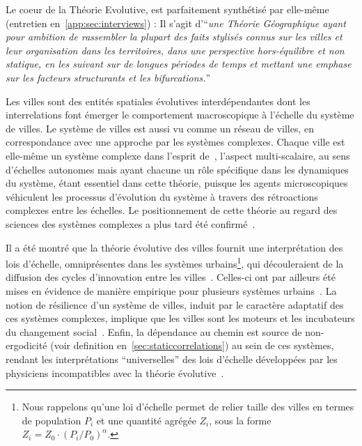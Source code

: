 Le coeur de la Théorie Evolutive, est parfaitement synthétisé par  elle-même (entretien en~\ref{app:sec:interviews}) : Il s'agit d'``\textit{une Théorie Géographique ayant pour ambition de rassembler la plupart des faits stylisés connus sur les villes et leur organisation dans les territoires, dans une perspective hors-équilibre et non statique, en les suivant sur de longues périodes de temps et mettant une emphase sur les facteurs structurants et les bifurcations.}''

Les villes sont des entités spatiales évolutives interdépendantes dont les interrelations font émerger le comportement macroscopique à l'échelle du système de villes. Le système de villes est aussi vu comme un réseau de villes, en correspondance avec une approche par les systèmes complexes. Chaque ville est elle-même un système complexe dans l'esprit de~\cite{berry1964cities}, l'aspect multi-scalaire, au sens d'échelles autonomes mais ayant chacune un rôle spécifique dans les dynamiques du système, étant essentiel dans cette théorie, puisque les agents microscopiques véhiculent les processus d'évolution du système à travers des rétroactions complexes entre les échelles. Le positionnement de cette théorie au regard des sciences des systèmes complexes a plus tard été confirmé~\cite{pumain2003approche}.

Il a été montré que la théorie évolutive des villes fournit une interprétation des lois d'échelle, omniprésentes dans les systèmes urbains\footnote{Nous rappelons qu'une loi d'échelle permet de relier taille des villes en termes de population $P_i$ et une quantité agrégée $Z_i$, sous la forme $Z_i = Z_0\cdot \left(P_i/P_0\right)^{\alpha}$.}, qui découleraient de la diffusion des cycles d'innovation entre les villes~\cite{pumain2006evolutionary}. Celles-ci ont par ailleurs été mises en évidence de manière empirique pour plusieurs systèmes urbains~\cite{pumain2009innovation}. La notion de résilience d'un système de villes, induit par le caractère adaptatif des ces systèmes complexes, implique que les villes sont les moteurs et les incubateurs du changement social~\cite{pumain2010theorie}. Enfin, la dépendance au chemin est source de non-ergodicité (voir definition en~\ref{sec:staticcorrelations}) au sein de ces systèmes, rendant les interprétations ``universelles'' des lois d'échelle développées par les physiciens incompatibles avec la théorie évolutive~\cite{pumain2010theorie}.




